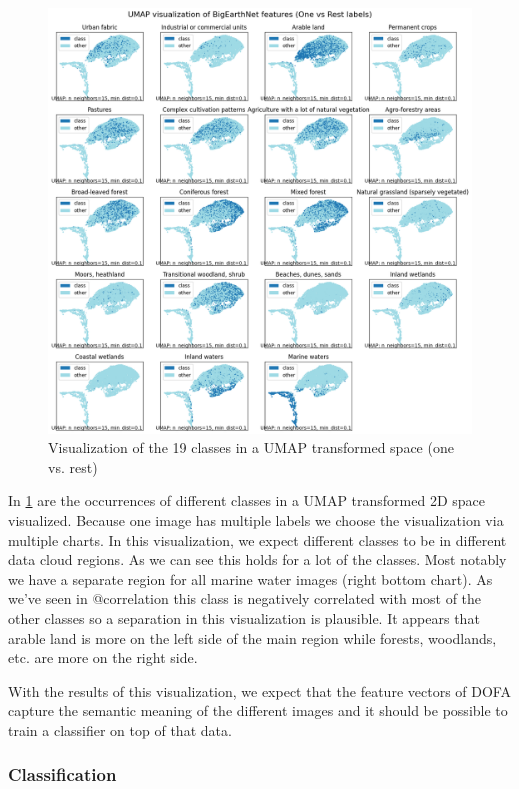 \begin{figure}
  \centering
  \includegraphics[width=\linewidth]{images/umap.png}
  \caption{Visualization of the 19 classes in a UMAP transformed space (one vs. rest)}
  \label{fig:umap}
\end{figure}

In \ref{fig:umap} are the occurrences of different classes in a UMAP transformed 2D space visualized. Because one image has multiple labels we choose the visualization via multiple charts. In this visualization, we expect different classes to be in different data cloud regions. As we can see this holds for a lot of the classes. Most notably we have a separate region for all marine water images (right bottom chart). As we've seen in @correlation this class is negatively correlated with most of the other classes so a separation in this visualization is plausible.
It appears that arable land is more on the left side of the main region while forests, woodlands, etc. are more on the right side.

With the results of this visualization, we expect that the feature vectors of DOFA capture the semantic meaning of the different images and it should be possible to train a classifier on top of that data.

\subsubsection{Classification}

